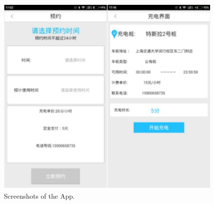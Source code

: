\begin{figure}[!t]
\centering
\includegraphics[width=1.0\linewidth]{./graph/app}
\caption{Screenshots of the App.}
\label{fig_app}
\end{figure}

